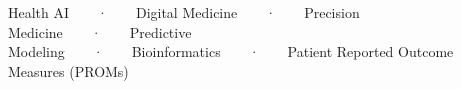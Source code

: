 

\begin{cvparagraph}
  Health AI~~~~·~~~~Digital Medicine~~~~·~~~~Precision Medicine~~~~·~~~~Predictive
  Modeling~~~~·~~~~Bioinformatics~~~~·~~~~Patient Reported Outcome Measures (PROMs)
\end{cvparagraph}


